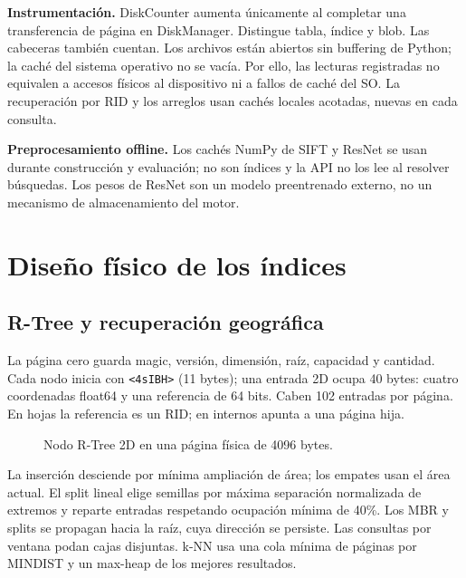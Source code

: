 \documentclass[11pt,a4paper]{article}
\newcommand{\code}[1]{\texttt{#1}}
\begin{document}
\textbf{Instrumentación.} DiskCounter aumenta únicamente al completar una transferencia de página en DiskManager. Distingue tabla, índice y blob. Las cabeceras también cuentan. Los archivos están abiertos sin buffering de Python; la caché del sistema operativo no se vacía. Por ello, las lecturas registradas no equivalen a accesos físicos al dispositivo ni a fallos de caché del SO. La recuperación por RID y los arreglos usan cachés locales acotadas, nuevas en cada consulta.

\textbf{Preprocesamiento offline.} Los cachés NumPy de SIFT y ResNet se usan durante construcción y evaluación; no son índices y la API no los lee al resolver búsquedas. Los pesos de ResNet son un modelo preentrenado externo, no un mecanismo de almacenamiento del motor.

\section{Diseño físico de los índices}\label{sec:fis}
\subsection{R-Tree y recuperación geográfica}
La página cero guarda magic, versión, dimensión, raíz, capacidad y cantidad. Cada nodo inicia con \code{<4sIBH>} (11 bytes); una entrada 2D ocupa 40 bytes: cuatro coordenadas float64 y una referencia de 64 bits. Caben 102 entradas por página. En hojas la referencia es un RID; en internos apunta a una página hija.

\begin{figure}[H]\centering
{}
\caption{Nodo R-Tree 2D en una página física de 4096 bytes.}\label{fig:rtree}
\end{figure}

La inserción desciende por mínima ampliación de área; los empates usan el área actual. El split lineal elige semillas por máxima separación normalizada de extremos y reparte entradas respetando ocupación mínima de 40\%. Los MBR y splits se propagan hacia la raíz, cuya dirección se persiste. Las consultas por ventana podan cajas disjuntas. k-NN usa una cola mínima de páginas por MINDIST y un max-heap de los mejores resultados.
\end{document}
